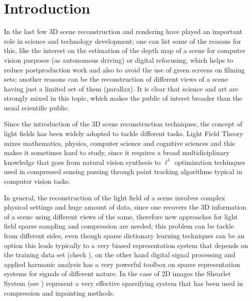 \chapter{Introduction}

In the last few 3D scene reconstruction and rendering have played an important role in science and technology development; one can list some of the reasons for this, like the interest on the estimation of the depth map of a scene for computer vision purposes (as autonomous driving) or digital refocusing, which helps to reduce postproduction work and also to avoid the use of green screens on filming sets; another reasons can be the reconstruction of different views of a scene having just a limited set of them (parallax). It is clear that science and art are strongly mixed in this topic, which makes the public of interet broader than the usual scientific public. 

\bigskip

Since the introduction of the 3D scene reconstruction techniques, the concept of light fields has been widely adopted to tackle different tasks. Light Field Theory mixes mathematics, physics, computer science and cognitive sciences and this makes it sometimes hard to study, since it requires a broad multidiciplinary knowledge that goes from natural vision synthesis to $\ell^1$ optimization techinques used in compressed sensing passing through point tracking algorithms typical in computer vision tasks.

\bigskip

In general, the reconstruction of the light field of a scene involves complex physical settings and huge amount of data, since one recovers the 3D information of a scene using different views of the same, therefore new approaches for light field sparse sampling and compression are needed; this problem can be tackle from different sides, even though sparse dictionary learning techniques can be an option this leads typically to a very biased representation system that depends on the training data set (check \cite{CompressedMIT}), on the other hand digital signal processing and applied harmonic analysis has a very powerful toolbox on sparse representation systems for signals of different nature. In the case of 2D images the Shearlet System (see \cite{IntroShearlets}) represent a very effective sparsifying system that has been used in compression and inpainting methods. 

\bigskip

